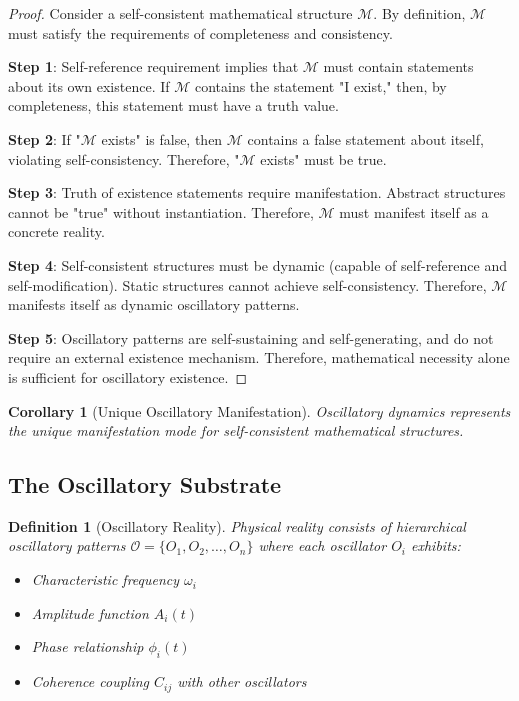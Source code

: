 \documentclass[11pt]{article}
\newtheorem{corollary}[theorem]{Corollary}
\newtheorem{definition}[theorem]{Definition}
\theoremstyle{remark}
\begin{document}
\begin{proof}
Consider a self-consistent mathematical structure $\mathcal{M}$. By definition, $\mathcal{M}$ must satisfy the requirements of completeness and consistency. 

\textbf{Step 1}: Self-reference requirement implies that $\mathcal{M}$ must contain statements about its own existence. If $\mathcal{M}$ contains the statement "I exist," then, by completeness, this statement must have a truth value.

\textbf{Step 2}: If "$\mathcal{M}$ exists" is false, then $\mathcal{M}$ contains a false statement about itself, violating self-consistency. Therefore, "$\mathcal{M}$ exists" must be true.

\textbf{Step 3}: Truth of existence statements require manifestation. Abstract structures cannot be "true" without instantiation. Therefore, $\mathcal{M}$ must manifest itself as a concrete reality.

\textbf{Step 4}: Self-consistent structures must be dynamic (capable of self-reference and self-modification). Static structures cannot achieve self-consistency. Therefore, $\mathcal{M}$ manifests itself as dynamic oscillatory patterns.

\textbf{Step 5}: Oscillatory patterns are self-sustaining and self-generating, and do not require an external existence mechanism. Therefore, mathematical necessity alone is sufficient for oscillatory existence.
\end{proof}

\begin{corollary}[Unique Oscillatory Manifestation]
Oscillatory dynamics represents the unique manifestation mode for self-consistent mathematical structures.
\end{corollary}

\subsection{The Oscillatory Substrate}

\begin{definition}[Oscillatory Reality]
Physical reality consists of hierarchical oscillatory patterns $\mathcal{O} = \{O_1, O_2, \ldots, O_n\}$ where each oscillator $O_i$ exhibits:
\begin{itemize}
\item Characteristic frequency $\omega_i$
\item Amplitude function $A_i(t)$
\item Phase relationship $\phi_i(t)$
\item Coherence coupling $C_{ij}$ with other oscillators
\end{itemize}
\end{definition}
\end{document}
